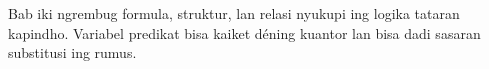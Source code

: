 \documentclass[../../../include/open-logic-chapter]{subfiles}
\begin{document}

\begin{editorial}
Bab iki ngrembug formula, struktur, lan relasi nyukupi ing logika tataran kapindho. Variabel predikat bisa kaiket déning kuantor lan bisa dadi sasaran substitusi ing rumus.
\end{editorial}







\OLEndChapterHook
\end{document}
